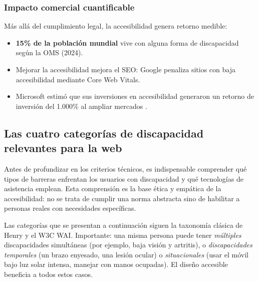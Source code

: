 \subsubsection{Impacto comercial cuantificable}

Más allá del cumplimiento legal, la accesibilidad genera retorno
medible:

\begin{itemize}
\item \textbf{15\% de la población mundial} vive con alguna forma de
discapacidad según la OMS (2024).
\item Mejorar la accesibilidad mejora el SEO: Google penaliza sitios
con baja accesibilidad mediante Core Web Vitals.
\item Microsoft estimó que sus inversiones en accesibilidad
generaron un retorno de inversión del 1.000\% al ampliar mercados
\cite{microsoft2020inclusive}.
\end{itemize}

\subsection{Las cuatro categorías de discapacidad relevantes para la web}

Antes de profundizar en los criterios técnicos, es indispensable
comprender qué tipos de barreras enfrentan los usuarios con
discapacidad y qué tecnologías de asistencia emplean. Esta
comprensión es la base ética y empática de la accesibilidad: no se
trata de cumplir una norma abstracta sino de habilitar a personas
reales con necesidades específicas.

Las categorías que se presentan a continuación siguen la taxonomía
clásica de Henry \cite{henry2018accessibility} y el W3C WAI.
Importante: una misma persona puede tener \emph{múltiples}
discapacidades simultáneas (por ejemplo, baja visión y artritis), o
\emph{discapacidades temporales} (un brazo enyesado, una lesión
ocular) o \emph{situacionales} (usar el móvil bajo luz solar
intensa, manejar con manos ocupadas). El diseño accesible beneficia
a todos estos casos.

